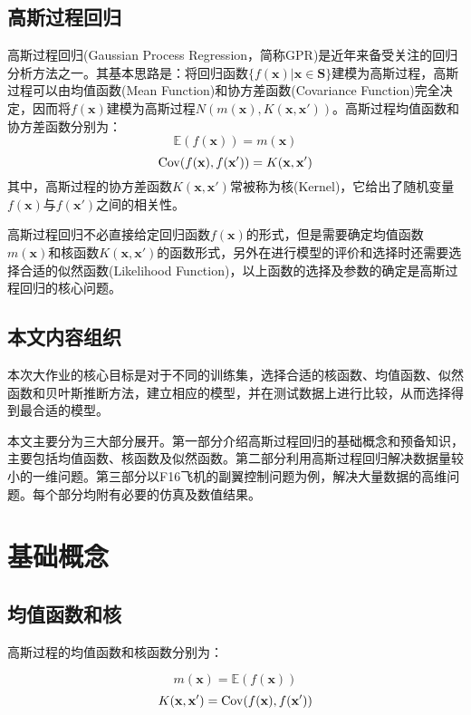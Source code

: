 \documentclass[10pt,twocolumn]{article}
\begin{document}
\subsection{高斯过程回归}
高斯过程回归(Gaussian Process Regression，简称GPR)是近年来备受关注的回归分析方法之一。其基本思路是：将回归函数$\{f(\mathbf{x})\vert\mathbf{x}\in \mathbf{S}\}$建模为高斯过程，高斯过程可以由均值函数(Mean Function)和协方差函数(Covariance Function)完全决定，因而将$f(\mathbf{x})$建模为高斯过程$N(m(\mathbf{x}),K(\mathbf{x},\mathbf{x}'))$。高斯过程均值函数和协方差函数分别为：
\[\mathbb{E}(f(\mathbf{x})) = m(\mathbf{x})\]
\[{\rm Cov}(f(\mathbf{x}),f(\mathbf{x}')) = K(\mathbf{x},\mathbf{x}')\]
其中，高斯过程的协方差函数$K(\mathbf{x},\mathbf{x}')$常被称为核(Kernel)，它给出了随机变量$f(\mathbf{x})$与$f(\mathbf{x}')$之间的相关性。

高斯过程回归不必直接给定回归函数$f(\mathbf{x})$的形式，但是需要确定均值函数$m(\mathbf{x})$和核函数$K(\mathbf{x},\mathbf{x}')$的函数形式，另外在进行模型的评价和选择时还需要选择合适的似然函数(Likelihood Function)，以上函数的选择及参数的确定是高斯过程回归的核心问题。

\subsection{本文内容组织}
本次大作业的核心目标是对于不同的训练集，选择合适的核函数、均值函数、似然函数和贝叶斯推断方法，建立相应的模型，并在测试数据上进行比较，从而选择得到最合适的模型。

本文主要分为三大部分展开。第一部分介绍高斯过程回归的基础概念和预备知识，主要包括均值函数、核函数及似然函数。第二部分利用高斯过程回归解决数据量较小的一维问题。第三部分以F16飞机的副翼控制问题为例，解决大量数据的高维问题。每个部分均附有必要的仿真及数值结果。

\section{基础概念}
\subsection{均值函数和核}
高斯过程的均值函数和核函数分别为：

\[m(\mathbf{x}) = \mathbb{E}(f(\mathbf{x}))\]
\[K(\mathbf{x},\mathbf{x}') = {\rm Cov}(f(\mathbf{x}),f(\mathbf{x}'))\]
\end{document}
